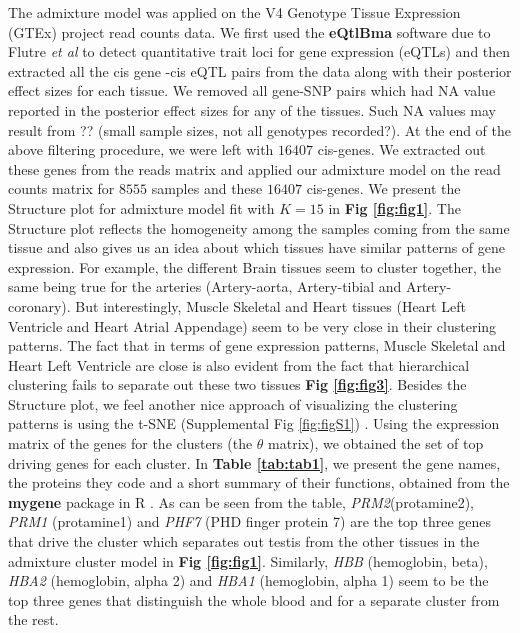 The admixture model was applied on the  V4 Genotype Tissue  Expression (GTEx) project  read counts data.  We first used the \textbf{eQtlBma} software due to Flutre \textit{et al} \cite{Flutre2013} to detect quantitative trait loci for gene expression (eQTLs) and then extracted all the cis gene -cis eQTL pairs from the data along with their posterior effect sizes for each tissue. We removed all gene-SNP pairs which had NA value reported in the posterior effect sizes for any of the tissues. Such NA values may result from ?? (small sample sizes, not all genotypes recorded?). At the end of the above filtering procedure, we were left with $16407$ cis-genes. We extracted out these genes from the reads matrix and applied our admixture model on the read counts matrix for $8555$ samples and these $16407$ cis-genes. We present the Structure plot for admixture model fit with $K=15$ in \textbf{Fig \ref{fig:fig1}}. The Structure plot reflects the homogeneity among the samples coming from the same tissue and also gives us an idea about which tissues have similar patterns of gene expression. For example, the different Brain tissues seem to cluster together, the same being true for the arteries (Artery-aorta, Artery-tibial and Artery-coronary). But interestingly, Muscle Skeletal and Heart tissues (Heart Left Ventricle and Heart Atrial Appendage) seem to be very close in their clustering patterns. The fact that in terms of gene expression patterns, Muscle Skeletal and Heart Left Ventricle are close is also evident from the fact that hierarchical clustering fails to separate out these two tissues \textbf{Fig \ref{fig:fig3}}. Besides the Structure plot, we feel another nice approach of visualizing the clustering patterns is using the t-SNE (Supplemental Fig \ref{fig:figS1}) \cite{Maaten2008} \cite{Maaten2014}. Using the expression matrix of the genes for the clusters (the $\theta$ matrix), we obtained the set of top driving genes for each cluster. In \textbf{Table \ref{tab:tab1}}, we present the gene names, the proteins they code and a short summary of their functions, obtained from the \textbf{mygene} package in R \cite{Thompson2014}. As can be seen from the table, \textit{PRM2}(protamine2), \textit{PRM1} (protamine1) and \textit{PHF7} (PHD finger protein 7) are the  top three genes that drive the cluster which separates out testis from the other tissues in the admixture cluster model in \textbf{Fig \ref{fig:fig1}}. Similarly, \textit{HBB} (hemoglobin, beta), \textit{HBA2} (hemoglobin, alpha 2) and \textit{HBA1} (hemoglobin, alpha 1) seem to be the top three genes that distinguish the whole blood and for a separate cluster from the rest. \\[3 pt]

